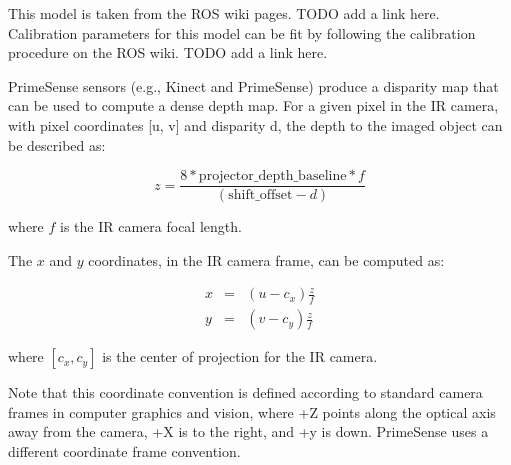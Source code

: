 This model is taken from the ROS wiki pages. TODO add a link here. Calibration parameters for this model can be fit by following the calibration procedure on the ROS wiki. TODO add a link here.

PrimeSense sensors (e.g., Kinect and PrimeSense) produce a disparity map that can be used to compute a dense depth map. For a given pixel in the IR camera, with pixel coordinates \mbox{[}u, v\mbox{]} and disparity d, the depth to the imaged object can be described as:

\[ z = \frac{8 * \mbox{projector\_depth\_baseline} * f}{(\mbox{shift\_offset} - d)} \]

where $f$ is the IR camera focal length.

The $x$ and $y$ coordinates, in the IR camera frame, can be computed as:

\begin{eqnarray*} x &=& (u - c_x) \frac{z}{f} \\ y &=& (v - c_y) \frac{z}{f} \end{eqnarray*}

where $[c_x, c_y]$ is the center of projection for the IR camera.

Note that this coordinate convention is defined according to standard camera frames in computer graphics and vision, where +Z points along the optical axis away from the camera, +X is to the right, and +y is down. PrimeSense uses a different coordinate frame convention. 

